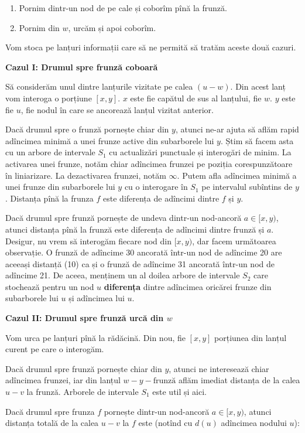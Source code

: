 \documentclass[../main.tex]{subfiles}
\begin{document}
\begin{enumerate}
  \item Pornim dintr-un nod de pe cale și coborîm pînă la frunză.
  \item Pornim din $w$, urcăm și apoi coborîm.
\end{enumerate}

Vom stoca pe lanțuri informații care să ne permită să tratăm aceste două cazuri.

\textbf{Cazul I: Drumul spre frunză coboară}

Să considerăm unul dintre lanțurile vizitate pe calea $(u-w)$. Din acest lanț vom interoga o porțiune $[x,y]$. $x$ este fie capătul de sus al lanțului, fie $w$. $y$ este fie $u$, fie nodul în care se ancorează lanțul vizitat anterior.

Dacă drumul spre o frunză pornește chiar din $y$, atunci ne-ar ajuta să aflăm rapid adîncimea minimă a unei frunze active din subarborele lui $y$. Știm să facem asta cu un arbore de intervale $S_1$ cu actualizări punctuale și interogări de minim. La activarea unei frunze, notăm chiar adîncimea frunzei pe poziția corespunzătoare în liniarizare. La dezactivarea frunzei, notăm $\infty$. Putem afla adîncimea minimă a unei frunze din subarborele lui $y$ cu o interogare în $S_1$ pe intervalul subîntins de $y$. Distanța pînă la frunza $f$ este diferența de adîncimi dintre $f$ și $y$.

Dacă drumul spre frunză pornește de undeva dintr-un nod-ancoră $a \in [x,y)$, atunci distanța pînă la frunză este diferența de adîncimi dintre frunză și $a$. Desigur, nu vrem să interogăm fiecare nod din $[x,y)$, dar facem următoarea observație. O frunză de adîncime 30 ancorată într-un nod de adîncime 20 are aceeași distanță (10) ca și o frunză de adîncime 31 ancorată într-un nod de adîncime 21. De aceea, menținem un al doilea arbore de intervale $S_2$ care stochează pentru un nod $u$ \textbf{diferența} dintre adîncimea oricărei frunze din subarborele lui $u$ și adîncimea lui $u$.

\textbf{Cazul II: Drumul spre frunză urcă din $w$}

Vom urca pe lanțuri pînă la rădăcină. Din nou, fie $[x,y]$ porțiunea din lanțul curent pe care o interogăm.

Dacă drumul spre frunză pornește chiar din $y$, atunci ne interesează chiar adîncimea frunzei, iar din lanțul $w-y-\textrm{frunză}$ aflăm imediat distanța de la calea $u-v$ la frunză. Arborele de intervale $S_1$ este util și aici.

Dacă drumul spre frunza $f$ pornește dintr-un nod-ancoră $a \in [x,y)$, atunci distanța totală de la calea $u-v$ la $f$ este (notînd cu $d(u)$ adîncimea nodului $u$):
\end{document}
